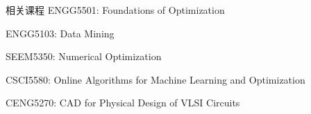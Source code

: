 \begin{rSection}{相关课程}
    ENGG5501: Foundations of Optimization

    ENGG5103: Data Mining 

    SEEM5350: Numerical Optimization 

    CSCI5580: Online Algorithms for Machine Learning and Optimization 

    CENG5270: CAD for Physical Design of VLSI Circuits
\end{rSection}

